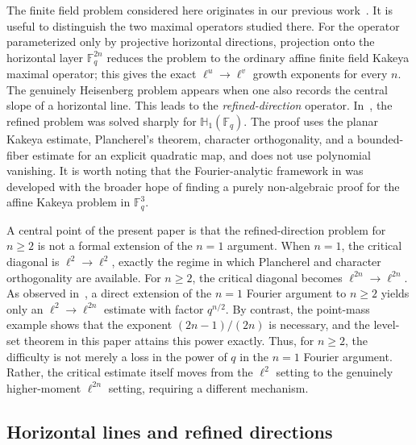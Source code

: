 \documentclass[11pt,letterpaper]{amsart}
\numberwithin{equation}{section}
\theoremstyle{definition}
\theoremstyle{remark}
\newcommand{\Fq}{\mathbb F_q}
\newcommand{\HH}{\mathbb H}
\begin{document}
The finite field problem considered here originates in our previous
work~\cite{PPTX26}. It is useful to distinguish the two maximal
operators studied there. For the operator parameterized only by
projective horizontal directions, projection onto the horizontal layer $\Fq^{2n}$ reduces the problem to the ordinary affine finite field Kakeya maximal operator; this gives the exact $\ell^u\to\ell^v$ growth exponents for every $n$. The genuinely Heisenberg problem appears when one also records the central slope of a horizontal line. This leads to the \emph{refined-direction} operator. In~\cite{PPTX26}, the refined problem was solved sharply for $\HH_1(\Fq)$. The proof uses the planar Kakeya estimate, Plancherel's theorem, character orthogonality, and a bounded-fiber estimate for an explicit quadratic map, and does not use polynomial vanishing. It is worth noting that the Fourier-analytic framework in \cite{PPTX26} was developed with the broader hope of finding a purely non-algebraic proof for the affine Kakeya problem in $\mathbb{F}_q^3$.

A central point of the present paper is that the refined-direction problem for $n\geq2$ is not a formal extension of the $n=1$ argument.  
When $n=1$, the critical diagonal is $\ell^2\to\ell^2$, exactly the regime in which Plancherel and character orthogonality are available. For $n\geq2$, the critical diagonal becomes
$
 \ell^{2n}\longrightarrow\ell^{2n}.
$
As observed in~\cite[Section~1]{PPTX26}, a direct extension of the $n=1$ Fourier argument to $n\geq2$ yields only an $\ell^2\to\ell^{2n}$ estimate with factor $q^{n/2}$.  By contrast, the point-mass example shows that the exponent $(2n-1)/(2n)$ is necessary, and the level-set theorem in this paper attains this power exactly. Thus, for $n\geq2$, the difficulty is not merely a loss in the power of $q$ in the $n=1$ Fourier argument. Rather, the critical estimate itself moves from the $\ell^2$ setting to the genuinely higher-moment $\ell^{2n}$ setting, requiring a different mechanism.



\subsection{Horizontal lines and refined directions}
\end{document}
